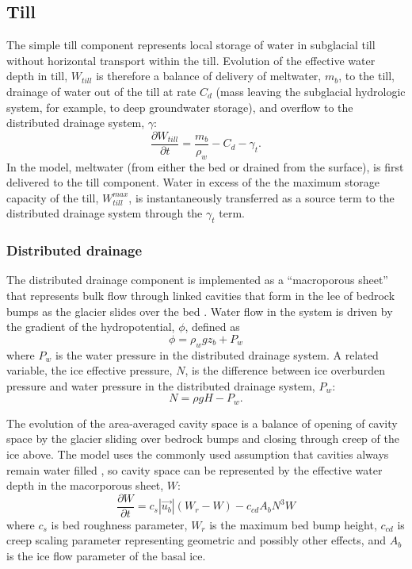 \subsection{Till}
The simple till component represents local storage of water in subglacial till without horizontal transport within the till.  
Evolution of the effective water depth in till, $W_{till}$ is therefore a balance of delivery of meltwater, $m_b$, to the till, drainage of water out of the till at rate $C_d$ (mass leaving the subglacial hydrologic system, for example, to deep groundwater storage), and overflow to the distributed drainage system, $\gamma$:
\begin{equation}
   \frac{\partial W_{till}}{\partial t} = \frac{m_b}{\rho_w} - C_d - \gamma_t.
\label{sgh:tillevol}
\end{equation}
In the model, meltwater (from either the bed or drained from the surface), is first delivered to the till component.  
Water in excess of the the maximum storage capacity of the till, $W_{till}^{max}$,
is instantaneously transferred as a source term to the distributed drainage system through the $\gamma_t$ term.

\subsubsection{Distributed drainage}
The distributed drainage component is implemented as a ``macroporous sheet'' that represents 
bulk flow through linked cavities that form in the lee of bedrock bumps as the glacier slides over the bed \citep{Flowers2002a, Hewitt2011, Flowers2015}.
Water flow in the system is driven by the gradient of the hydropotential, $\phi$, defined as
\begin{equation}
   \phi = \rho_w g z_b + P_w
\label{sgh:phi}
\end{equation}
where $P_w$ is the water pressure in the distributed drainage system.
A related variable, the ice effective pressure, $N$, is the difference between ice overburden pressure and water pressure in the distributed drainage system, $P_w$:
\begin{equation}
   N = \rho g H - P_w .
\label{sgh:N}
\end{equation}

The evolution of the area-averaged cavity space is a balance of 
opening of cavity space by the glacier sliding over bedrock bumps 
and closing through creep of the ice above.
The model uses the commonly used assumption \citep[e.g.][]{Schoof2010a,Hewitt2011,Werder2013,Hoffman2014} 
that cavities always remain water filled \citep[c.f.][]{Schoof2012},
so cavity space can be represented by the effective water depth in the macorporous sheet, $W$:
\begin{equation}
   \frac{\partial W}{\partial t} = c_s |\vec{u_b}| (W_r - W) - c_{cd} A_b N^3 W
\label{sgh:cavityevol}
\end{equation}
where $c_s$ is bed roughness parameter, $W_r$ is the maximum bed bump height,
$c_{cd}$ is creep scaling parameter representing geometric and possibly other effects, 
and $A_b$ is the ice flow parameter of the basal ice.

